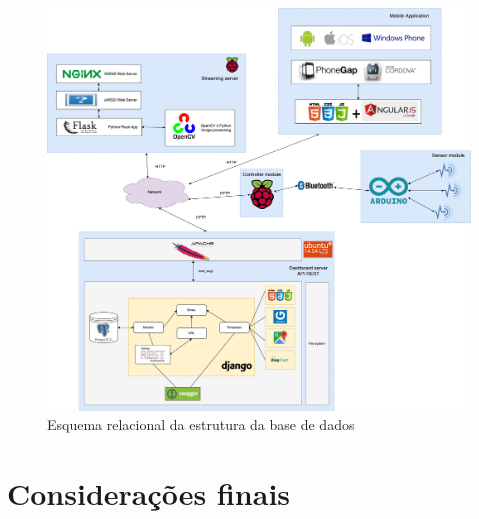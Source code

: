 \begin{figure}[!htb]
	\centering
	\includegraphics[width=\linewidth]{esquemas/arquitetura-final.pdf}
	\caption{Esquema relacional da estrutura da base de dados}
	\label{esquemarelacional}
\end{figure}








\newpage








\section{Considerações finais}